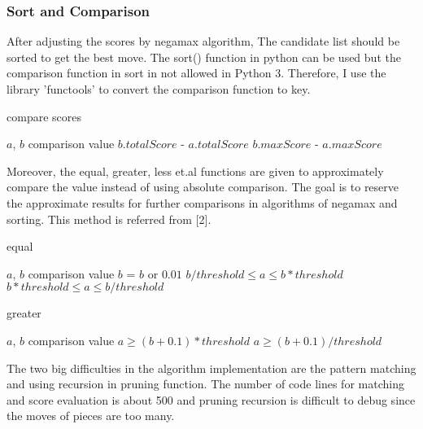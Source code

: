 \documentclass[9pt,shortpaper,twoside,web]{ieeecolor}
\begin{document}
\subsubsection{Sort and Comparison}
After adjusting the scores by negamax algorithm, The candidate list should be sorted to get the best move. The sort() function in python can be used but the comparison function in sort in not allowed in Python 3. Therefore, I use the library 'functools' to convert the comparison function to key.

\begin{algorithm}
 \caption{compare scores}
 \begin{algorithmic}[h]
 \renewcommand{\algorithmicrequire}{\textbf{Input:}}
 \renewcommand{\algorithmicensure}{\textbf{Output:}}
 \REQUIRE $a$, $b$
 \ENSURE comparison value 
  \RETURN $b.totalScore$ - $a.totalScore$
  \ENDIF
  \RETURN $b.maxScore$ - $a.maxScore$
\end{algorithmic} 
\end{algorithm}

Moreover, the equal, greater, less et.al functions are given to approximately compare the value instead of using absolute comparison. The goal is to reserve the approximate results for further comparisons in algorithms of negamax and sorting. This method is referred from [2].

\begin{algorithm}
 \caption{equal}
 \begin{algorithmic}[h]
 \renewcommand{\algorithmicrequire}{\textbf{Input:}}
 \renewcommand{\algorithmicensure}{\textbf{Output:}}
 \REQUIRE $a$, $b$
 \ENSURE comparison value 
  \STATE $b$ = $b$ or $0.01$
  \RETURN $b/threshold\leq a\leq b*threshold$
  \ENDIF
  \RETURN $b*threshold\leq a\leq b/threshold$
 \end{algorithmic} 
 \end{algorithm}
 
\begin{algorithm}
 \caption{greater}
 \begin{algorithmic}[h]
 \renewcommand{\algorithmicrequire}{\textbf{Input:}}
 \renewcommand{\algorithmicensure}{\textbf{Output:}}
 \REQUIRE $a$, $b$
 \ENSURE comparison value 
  \RETURN $a\geq (b+0.1)*threshold$
  \ENDIF
  \RETURN $a\geq (b+0.1)/threshold$
 \end{algorithmic} 
 \end{algorithm}
 

The two big difficulties in the algorithm implementation are the pattern matching and using recursion in pruning function. The number of code lines for matching and score evaluation is about 500 and pruning recursion is difficult to debug since the moves of pieces are too many.   
\end{document}
